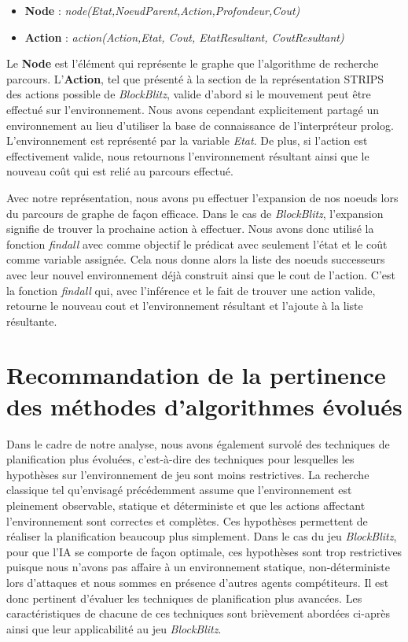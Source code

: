 \documentclass[12pt,english,frenchb,letterpaper]{article}
\begin{document}
\begin{itemize}
\item \textbf{Node} : \textit{node(Etat,NoeudParent,Action,Profondeur,Cout)}
\item \textbf{Action} : \textit{action(Action,Etat, Cout, EtatResultant, CoutResultant)}
\end{itemize}

Le \textbf{Node} est l'élément qui représente le graphe que l'algorithme de recherche parcours. L'\textbf{Action}, tel que présenté à la section de la représentation STRIPS des actions possible de \textit{BlockBlitz}, valide d'abord si le mouvement peut être effectué sur l'environnement. Nous avons cependant explicitement partagé un environnement au lieu d'utiliser la base de connaissance de l'interpréteur prolog. L'environnement est représenté par la variable \textit{Etat}. De plus, si l'action est effectivement valide, nous retournons l'environnement résultant ainsi que le nouveau coût qui est relié au parcours effectué.

Avec notre représentation, nous avons pu effectuer l'expansion de nos noeuds lors du parcours de graphe de façon efficace. Dans le cas de \textit{BlockBlitz}, l'expansion signifie de trouver la prochaine action à effectuer. Nous avons donc utilisé la fonction \textit{findall} avec comme objectif le prédicat avec seulement l'état et le coût comme variable assignée. Cela nous donne alors la liste des noeuds successeurs avec leur nouvel environnement déjà construit ainsi que le cout de l'action. C'est la fonction \textit{findall} qui, avec l'inférence et le fait de trouver une action valide, retourne le nouveau cout et l'environnement résultant et l'ajoute à la liste résultante.


\section{Recommandation de la pertinence des méthodes d'algorithmes évolués}

Dans le cadre de notre analyse, nous avons également survolé des techniques de planification plus évoluées, c'est-à-dire des techniques pour lesquelles les hypothèses sur l'environnement de jeu sont moins restrictives.  La recherche classique tel qu'envisagé précédemment assume que l'environnement est pleinement observable, statique et déterministe et que les actions affectant l'environnement sont correctes et complètes. Ces hypothèses permettent de réaliser la planification beaucoup plus simplement.
Dans le cas du jeu \textit{BlockBlitz}, pour que l'IA se comporte de fa\c con optimale, ces hypothèses sont trop restrictives puisque nous n'avons pas affaire à un environnement statique, non-déterministe lors d'attaques et nous sommes en présence d'autres agents compétiteurs.  Il est donc pertinent d'évaluer les techniques de planification plus avancées.  Les caractéristiques de chacune de ces techniques sont brièvement abordées ci-après ainsi que leur applicabilité au jeu \textit{BlockBlitz}.
\end{document}
